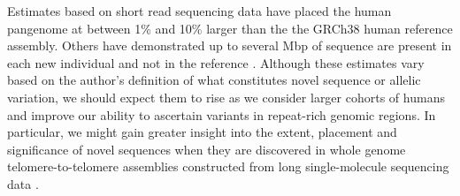 Estimates based on short read sequencing data have placed the human pangenome at between 1\% \cite{li2010building} and 10\% \cite{sherman2019assembly} larger than the the GRCh38 human reference assembly.
Others have demonstrated up to several Mbp of sequence are present in each new individual and not in the reference \cite{Hehir-Kwa2016-hb,Steinberg_2016,Audano_2019}.
Although these estimates vary based on the author's definition of what constitutes novel sequence or allelic variation, we should expect them to rise as we consider larger cohorts of humans and improve our ability to ascertain variants in repeat-rich genomic regions.
In particular, we might gain greater insight into the extent, placement and significance of novel sequences when they are discovered in whole genome telomere-to-telomere assemblies constructed from long single-molecule sequencing data \cite{miga2019telomere,Langley_2019}.





